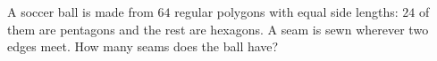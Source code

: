 A soccer ball is made from $64$ regular polygons with equal side lengths: $24$ of them are pentagons and the rest are hexagons. A seam is sewn wherever two edges meet. How many seams does the ball have?
